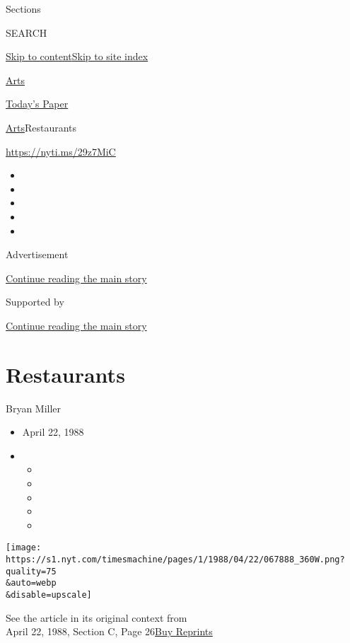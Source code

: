 Sections

SEARCH

\protect\hyperlink{site-content}{Skip to
content}\protect\hyperlink{site-index}{Skip to site index}

\href{https://www.nytimes.com/section/arts}{Arts}

\href{https://myaccount.nytimes.com/auth/login?response_type=cookie\&client_id=vi}{}

\href{https://www.nytimes.com/section/todayspaper}{Today's Paper}

\href{/section/arts}{Arts}\textbar{}Restaurants

\url{https://nyti.ms/29z7MiC}

\begin{itemize}
\item
\item
\item
\item
\item
\end{itemize}

Advertisement

\protect\hyperlink{after-top}{Continue reading the main story}

Supported by

\protect\hyperlink{after-sponsor}{Continue reading the main story}

\hypertarget{restaurants}{%
\section{Restaurants}\label{restaurants}}

Bryan Miller

\begin{itemize}
\item
  April 22, 1988
\item
  \begin{itemize}
  \item
  \item
  \item
  \item
  \item
  \end{itemize}
\end{itemize}

\texttt{[image: https://s1.nyt.com/timesmachine/pages/1/1988/04/22/067888\_360W.png?quality=75\\\&auto=webp\\\&disable=upscale]}

See the article in its original context from\\
April 22, 1988, Section C, Page
26\href{https://store.nytimes.com/collections/new-york-times-page-reprints?utm_source=nytimes\&utm_medium=article-page\&utm_campaign=reprints}{Buy
Reprints}

